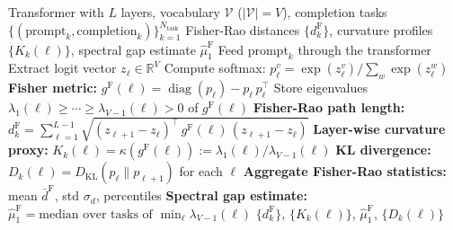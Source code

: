 \documentclass[11pt]{article}
\DeclareMathOperator{\diag}{diag}
\newcommand{\RR}{\mathbb{R}}
\newcommand{\gF}{g^{\mathrm{F}}}
\newcommand{\DKL}{D_{\mathrm{KL}}}
\theoremstyle{remark}
\begin{document}
\begin{algorithm}[H]
\caption{Fisher-Metric Extraction from Transformer Logits}
\label{alg:fisher-extraction}
\begin{algorithmic}[1]
\Require Transformer with $L$ layers, vocabulary $\mathcal{V}$ ($|\mathcal{V}|=V$),
completion tasks $\{(\text{prompt}_k, \text{completion}_k)\}_{k=1}^{N_{\mathrm{task}}}$
\Ensure Fisher-Rao distances $\{d^{\mathrm{F}}_k\}$, curvature profiles
$\{K_k(\ell)\}$, spectral gap estimate $\hat\mu_1^{\mathrm{F}}$
  \State Feed $\text{prompt}_k$ through the transformer
    \State Extract logit vector $z_{\ell} \in \RR^V$
    \State Compute softmax: $p_{\ell}^v = \exp(z_\ell^v)/\sum_w \exp(z_\ell^w)$
    \State \textbf{Fisher metric:}
    $\gF(\ell) = \diag(p_\ell) - p_\ell\, p_\ell^\top$
    \State Store eigenvalues $\lambda_1(\ell) \ge \cdots \ge \lambda_{V-1}(\ell) > 0$
    of $\gF(\ell)$
  \EndFor
  \State \textbf{Fisher-Rao path length:}
  $d_k^{\mathrm{F}} = \sum_{\ell=1}^{L-1}
  \sqrt{(z_{\ell+1} - z_\ell)^\top\, \gF(\ell)\, (z_{\ell+1} - z_\ell)}$
  \State \textbf{Layer-wise curvature proxy:}
  $K_k(\ell) = \kappa(\gF(\ell)) := \lambda_1(\ell)/\lambda_{V-1}(\ell)$
  \State \textbf{KL divergence:}
  $D_k(\ell) = \DKL(p_\ell \| p_{\ell+1})$
  for each $\ell$
\EndFor
\State \textbf{Aggregate Fisher-Rao statistics:}
mean $\bar{d}^{\mathrm{F}}$, std $\sigma_d$, percentiles
\State \textbf{Spectral gap estimate:}
$\hat\mu_1^{\mathrm{F}} = \text{median over tasks of } \min_\ell \lambda_{V-1}(\ell)$
\State \Return $\{d_k^{\mathrm{F}}\}$, $\{K_k(\ell)\}$, $\hat\mu_1^{\mathrm{F}}$,
$\{D_k(\ell)\}$
\end{algorithmic}
\end{algorithm}
\end{document}
